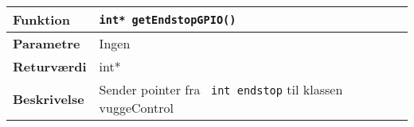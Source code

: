 \begin{center}
    \begin{tabular}{ | l | p{} |}
    \hline
    \textbf{Funktion}	& \verb+int* getEndstopGPIO() +				\\ \hline
    \textbf{Parametre} 	& Ingen							 		\\ \hline
    \textbf{Returværdi}	& int*									\\ \hline
    \textbf{Beskrivelse}	& Sender pointer fra \verb+ int endstop+ til klassen vuggeControl	\\ \hline
    \end{tabular}
\end{center}